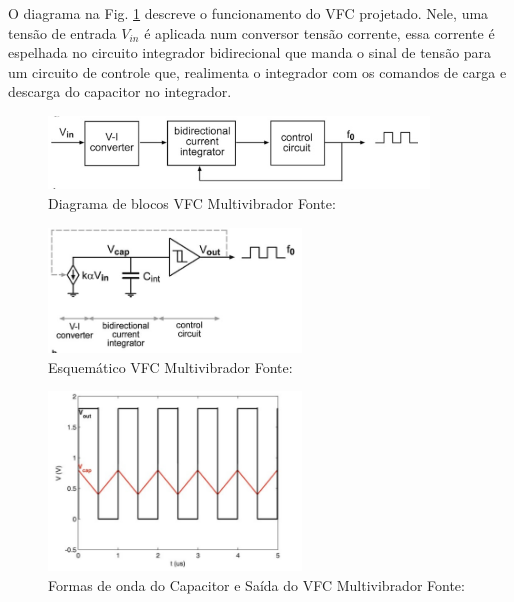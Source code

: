 O diagrama na Fig. \ref{fig04} descreve o funcionamento do VFC projetado. Nele, uma tensão de entrada $V_{in}$ é aplicada num conversor tensão corrente, essa corrente é espelhada no circuito integrador bidirecional que manda o sinal de tensão para um circuito de controle que, realimenta o integrador com os comandos de carga e descarga do capacitor no integrador.

\begin{figure}[htb]
	\centering
	\includegraphics[width=0.9\textwidth]{figuras/blocks_diagram_vf.png}
	\caption{Diagrama de blocos VFC Multivibrador Fonte:\cite{livroprincipal} }
	\label{fig04}
\end{figure}



\begin{figure}[htb]
	\centering
	\includegraphics[width=0.6\textwidth]{figuras/sch_diagrama.png}
	\caption{Esquemático VFC Multivibrador Fonte:\cite{livroprincipal} }
	\label{fig05}
\end{figure}

\begin{figure}[htb]
	\centering
	\includegraphics[width=0.6\textwidth]{figuras/formas_ondas.png}
	\caption{Formas de onda do Capacitor e Saída do VFC Multivibrador Fonte:\cite{livroprincipal} }
	\label{fig06}
\end{figure}

